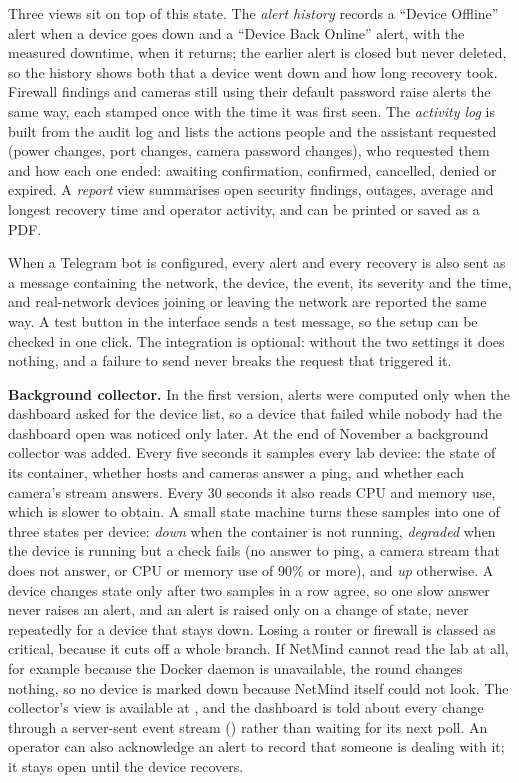 Three views sit on top of this state. The \emph{alert history} records a
``Device Offline'' alert when a device goes down and a ``Device Back Online''
alert, with the measured downtime, when it returns; the earlier alert is
closed but never deleted, so the history shows both that a device went down
and how long recovery took. Firewall findings and cameras still using their
default password raise alerts the same way, each stamped once with the time
it was first seen. The \emph{activity log} is built from the audit log and
lists the actions people and the assistant requested (power changes, port
changes, camera password changes), who requested them and how each one
ended: awaiting confirmation, confirmed, cancelled, denied or expired. A
\emph{report} view summarises open security findings, outages, average and
longest recovery time and operator activity, and can be printed or saved as a
PDF.

When a Telegram bot is configured, every alert and every recovery is also
sent as a message containing the network, the device, the event, its severity
and the time, and real-network devices joining or leaving the network are
reported the same way. A test button in the interface sends a test message,
so the setup can be checked in one click. The integration is optional: without
the two settings it does nothing, and a failure to send never breaks the
request that triggered it.

\textbf{Background collector.} In the first version, alerts were computed
only when the dashboard asked for the device list, so a device that failed
while nobody had the dashboard open was noticed only later. At the end of
November a background collector was added. Every five seconds it samples
every lab device: the state of its container, whether hosts and cameras
answer a ping, and whether each camera's stream answers. Every 30 seconds it
also reads CPU and memory use, which is slower to obtain. A small state
machine turns these samples into one of three states per device:
\emph{down} when the container is not running, \emph{degraded} when the
device is running but a check fails (no answer to ping, a camera stream that
does not answer, or CPU or memory use of 90\% or more), and \emph{up}
otherwise. A device changes state only after two samples in a row agree, so
one slow answer never raises an alert, and an alert is raised only on a
change of state, never repeatedly for a device that stays down. Losing a
router or firewall is classed as critical, because it cuts off a whole
branch. If NetMind cannot read the lab at all, for example because the Docker
daemon is unavailable, the round changes nothing, so no device is marked down
because NetMind itself could not look. The collector's view is available at
, and the dashboard is told about every change through a
server-sent event stream () rather than waiting for its
next poll. An operator can also acknowledge an alert to record that someone
is dealing with it; it stays open until the device recovers.

